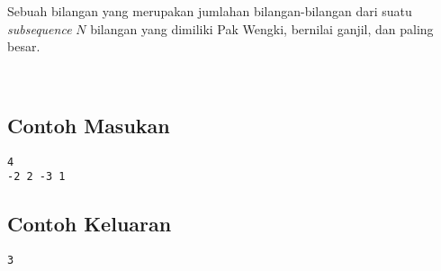 \documentclass{article}
\begin{document}
Sebuah bilangan yang merupakan jumlahan bilangan-bilangan dari suatu \textit{subsequence} $N$ bilangan yang dimiliki Pak Wengki, bernilai ganjil, dan paling besar.


\\
\begin{multicols}{2}
\subsection*{Contoh Masukan}
\begin{lstlisting}
4
-2 2 -3 1
\end{lstlisting}
\columnbreak
\subsection*{Contoh Keluaran}
\begin{lstlisting}
3
\end{lstlisting}
\vfill
\null
\end{multicols}


\pagebreak
\end{document}
